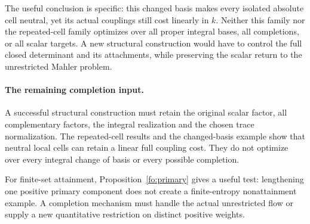 The useful conclusion is specific: this changed basis makes every isolated absolute cell neutral, yet its actual couplings still cost linearly in $k$.
Neither this family nor the repeated-cell family optimizes over all proper integral bases, all completions, or all scalar targets.
A new structural construction would have to control the full closed determinant and its attachments, while preserving the scalar return to the unrestricted Mahler problem.

\paragraph{The remaining completion input.}
A successful structural construction must retain the original scalar factor, all complementary factors, the integral realization and the chosen trace normalization.
The repeated-cell results and the changed-basis example show that neutral local cells can retain a linear full coupling cost.
They do not optimize over every integral change of basis or every possible completion.


For finite-set attainment, Proposition~\ref{fo:primary} gives a useful test: lengthening one positive primary component does not create a finite-entropy nonattainment example.
A completion mechanism must handle the actual unrestricted flow or supply a new quantitative restriction on distinct positive weights.
